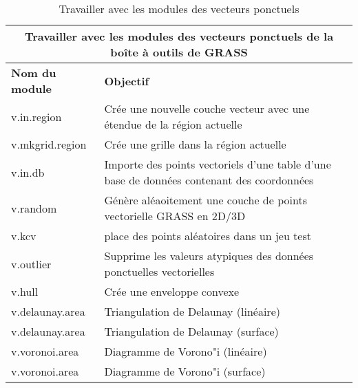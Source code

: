 \begin{table}[H]
\centering
 \begin{tabular}{|p{4cm}|p{10cm}|}
\hline \multicolumn{2}{|c|}{\textbf{Travailler avec les modules des vecteurs ponctuels de la boîte à outils de GRASS}} \\
  \hline \textbf{Nom du module} & \textbf{Objectif} \\
  \hline v.in.region & Crée une nouvelle couche vecteur avec une étendue de la région actuelle\\
  \hline v.mkgrid.region & Crée une grille dans la région actuelle\\
  \hline v.in.db & Importe des points vectoriels d'une table d'une base de données contenant des coordonnées\\
  \hline v.random & Génère aléaoitement une couche de points vectorielle GRASS en 2D/3D\\
  \hline v.kcv & place des points aléatoires dans un jeu test\\
  \hline v.outlier & Supprime les valeurs atypiques des données ponctuelles vectorielles\\
  \hline v.hull & Crée une enveloppe convexe\\
  \hline v.delaunay.area & Triangulation de Delaunay (linéaire) \\
  \hline v.delaunay.area & Triangulation de Delaunay (surface) \\
  \hline v.voronoi.area & Diagramme de Vorono"i (linéaire) \\
  \hline v.voronoi.area & Diagramme de Vorono"i (surface) \\
\hline
\end{tabular}
\caption{Travailler avec les modules des vecteurs ponctuels}
\end{table}

